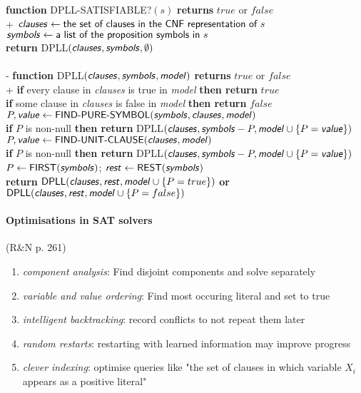 \documentclass{article}
\begin{document}
\begin{pseudo}
    \textbf{function} DPLL-SATISFIABLE?$(s)$ \textbf{returns} $true$ or $false$\\+
    $\textsf{\emph{clauses}}\leftarrow\textsf{the set of clauses in the CNF representation of }s$\\
    $\textsf{\emph{symbols}}\leftarrow\textsf{a list of the proposition symbols in }s$\\
    \textbf{return} DPLL$(\textsf{\emph{clauses}}, \textsf{\emph{symbols}}, \emptyset)$
    \\\\-
    \textbf{function} DPLL$(\textsf{\emph{clauses}}, \textsf{\emph{symbols}}, \textsf{\emph{model}})$ \textbf{returns} $true$ or $false$\\+
    \textbf{if} every clause in \emph{clauses} is true in \emph{model} \textbf{then return} $true$\\
    \textbf{if} some clause in \emph{clauses} is false in \emph{model} \textbf{then return} $false$\\
    $P,\textsf{\emph{value}}\leftarrow\textsf{FIND-PURE-SYMBOL}(\textsf{\emph{symbols}},\textsf{\emph{clauses}},\textsf{\emph{model}})$\\
    \textbf{if} $P$ is non-null \textbf{then return} DPLL$(\textsf{\emph{clauses}}, \textsf{\emph{symbols}}-P,\textsf{\emph{model}}\cup\{P=\textsf{\emph{value}}\})$\\
    $P,\textsf{\emph{value}}\leftarrow\textsf{FIND-UNIT-CLAUSE}(\textsf{\emph{clauses}}, \textsf{\emph{model}})$\\
    \textbf{if} $P$ is non-null \textbf{then return} DPLL$(\textsf{\emph{clauses}}, \textsf{\emph{symbols}}-P,\textsf{\emph{model}}\cup\{P=\textsf{\emph{value}}\})$\\
    $P\leftarrow\textsf{FIRST}(\textsf{\emph{symbols}})$; $\textsf{\emph{rest}}\leftarrow\textsf{REST}(\textsf{\emph{symbols}})$\\
    \textbf{return} $\textsf{DPLL}(\textsf{\emph{clauses}}, \textsf{\emph{rest}}, \textsf{\emph{model}}\cup\{P=true\})$ \textbf{or}
    $\textsf{DPLL}(\textsf{\emph{clauses}}, \textsf{\emph{rest}}, \textsf{\emph{model}}\cup\{P=false\})$
\end{pseudo}

\paragraph{Optimisations in SAT solvers}
(R\&N p. 261)
\begin{enumerate}
    \item \emph{component analysis}: Find disjoint components and solve separately
    \item \emph{variable and value ordering}: Find most occuring literal and set to true
    \item \emph{intelligent backtracking}: record conflicts to not repeat them later
    \item \emph{random restarts}: restarting with learned information may improve progress
    \item \emph{clever indexing}: optimise queries like "the set of clauses in which variable $X_i$ appears as a positive literal"
\end{enumerate}
\end{document}
